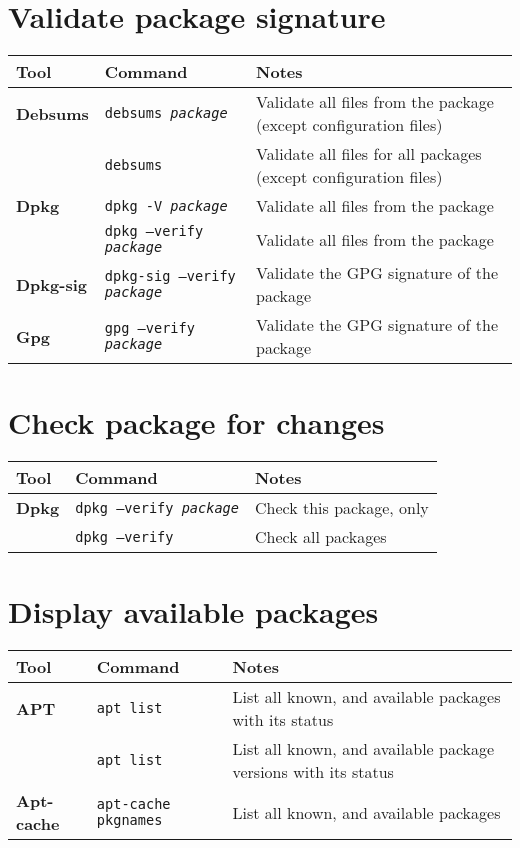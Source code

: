 \documentclass[10pt]{article}
\begin{document}
\newpage

\cheatsheet
\section{Validate package signature}
\begin{tabular}{ p{3.5cm} p{9cm} p{11cm}}
  \hline
  \rowcolor{Gray}
  \textbf{Tool} & \textbf{Command} & \textbf{Notes} \\
  \hline 
  \textbf{Debsums} & \texttt{debsums \textit{package}} & Validate all files from the package (except configuration files)\\
  \rowcolor{Gray}
  ~ & \texttt{debsums} & Validate all files for all packages (except configuration files) \\
  \textbf{Dpkg} & \texttt{dpkg -V \textit{package}} & Validate all files from the package \\
  \rowcolor{Gray}
  & \texttt{dpkg --verify \textit{package}} & Validate all files from the package \\
  \textbf{Dpkg-sig} & \texttt{dpkg-sig --verify \textit{package}} & Validate the GPG signature of the package \\
  \rowcolor{Gray}
  \textbf{Gpg} & \texttt{gpg --verify \textit{package}} & Validate the GPG signature of the package \\
  \hline
\end{tabular}

\section{Check package for changes}
\begin{tabular}{ p{3.5cm} p{9cm} p{11cm}}
  \hline
  \rowcolor{Gray}
  \textbf{Tool} & \textbf{Command} & \textbf{Notes} \\
  \hline 
  \textbf{Dpkg} & \texttt{dpkg --verify \textit{package}} & Check this package, only \\
  \rowcolor{Gray}
  & \texttt{dpkg --verify} & Check all packages \\
  \hline
\end{tabular}


\section{Display available packages}
\begin{tabular}{ p{3.5cm} p{9cm} p{11cm}}
  \hline
  \rowcolor{Gray}
  \textbf{Tool} & \textbf{Command} & \textbf{Notes} \\
  \hline 
  \textbf{APT} & \texttt{apt list} & List all known, and available packages with its status\\
  \rowcolor{Gray}
  & \texttt{apt list} & List all known, and available package versions with its status\\
  \textbf{Apt-cache} & \texttt{apt-cache pkgnames} & List all known, and available packages\\
  \hline
\end{tabular}
\end{document}
